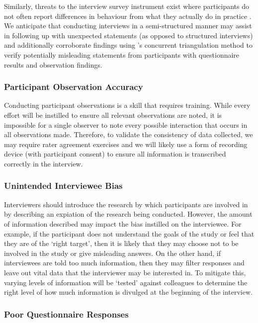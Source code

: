 Similarly, threats to the interview survey instrument exist where participants do not often report differences in behaviour from what they actually do in practice \citep{Singer:2007tu}. We anticipate that conducting interviews in a semi-structured manner may assist in following up with unexpected statements (as opposed to structured interviews) and additionally corroborate findings using \citeauthor{Jick:1979el}'s concurrent triangulation method \citep{Jick:1979el} to verify potentially misleading statements from participants with questionnaire results and observation findings.

\subsubsection{Participant Observation Accuracy}

Conducting participant observations is a skill that requires training. While every effort will be instilled to ensure all relevant observations are noted, it is impossible for a single observer to note every possible interaction that occurs in all observations made. Therefore, to validate the consistency of data collected, we may require rater agreement exercises \citep{Judd:1991ug} and we will likely use a form of recording device (with participant consent) to ensure all information is transcribed correctly in the interview.

\subsubsection{Unintended Interviewee Bias}

Interviewers should introduce the research by which participants are involved in by describing an expiation of the research being conducted. However, the amount of information described may impact the bias instilled on the interviewee. For example, if the participant does not understand the goals of the study or feel that they are of the `right target', then it is likely that they may choose not to be involved in the study or give misleading answers. On the other hand, if interviewees are told too much information, then they may filter responses and leave out vital data that the interviewer may be interested in. To mitigate this, varying levels of information will be `tested' against colleagues to determine the right level of how much information is divulged at the beginning of the interview.

\subsubsection{Poor Questionnaire Responses}

